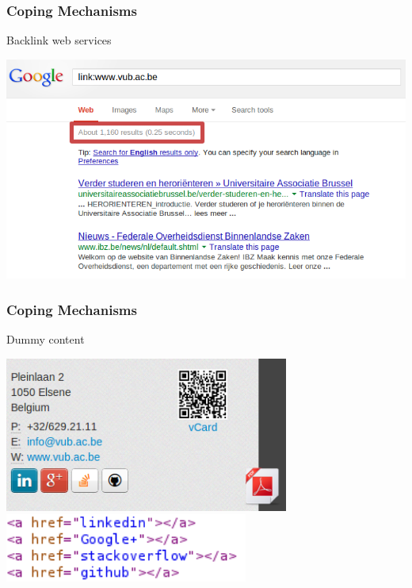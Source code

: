 \begin{frame}
\frametitle{Coping Mechanisms}
	\begin{block}{Backlink web services}
		\begin{center}
			\includegraphics[width=1\textwidth]{./images/backlinkCheck.png}
		\end{center}
	\end{block}
\end{frame}
\begin{frame}[fragile]
\frametitle{Coping Mechanisms}
	\begin{block}{Dummy content}
		\begin{center}
			\includegraphics[width=0.7\textwidth]{./images/addingElements.jpg}\vspace{0.2cm}
			\includegraphics[width=0.6\textwidth]{./images/dummycontent.png}
		\end{center}
	\end{block}
\end{frame}
